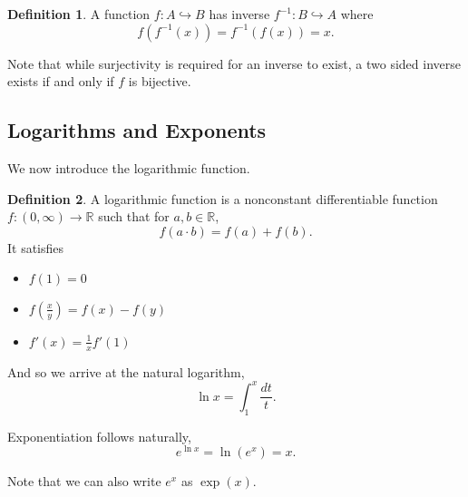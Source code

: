 \documentclass[11pt]{scrartcl}
\theoremstyle{plain}
\theoremstyle{definition}
\newtheorem*{definition}{Definition}
\theoremstyle{remark}
\begin{document}
\begin{definition}
    A function $f\colon A\hookrightarrow B$ has inverse $f^{-1}\colon B\hookrightarrow A$ where
    \[f(f^{-1}(x))=f^{-1}(f(x))=x.\]
\end{definition}

Note that while surjectivity is required for an inverse to exist, a two sided inverse exists if and only if $f$ is bijective.

\subsection{Logarithms and Exponents}

We now introduce the logarithmic function.

\begin{definition}
    A logarithmic function is a nonconstant differentiable function $f\colon(0,\infty)\to \mathbb{R}$ such that for $a,b\in \mathbb{R}$,
    \[ f(a\cdot b)=f(a)+f(b). \]
    It satisfies
    \begin{itemize}
        \item $f(1)=0$
        \item $f\left( \frac{x}{y} \right)=f(x)-f(y)$
        \item $f'(x)=\frac{1}{x}f'(1)$
    \end{itemize}
\end{definition}

And so we arrive at the natural logarithm, 
\[ \ln x=\int_{1}^{x} \frac{dt}{t}. \]

Exponentiation follows naturally, 
\[ e^{\ln x}=\ln(e^x)=x. \]

Note that we can also write $e^x$ as $\exp(x)$. 
\end{document}
